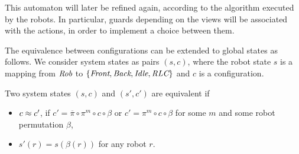 This automaton will later be refined 
again, according to the algorithm executed by the robots. In particular, 
guards depending on the views will be associated with the actions, 
in order to implement a choice between them.


The equivalence between configurations can be extended to global states as follows.
We consider system states as pairs $(s,c)$, where the robot state $s$ is a mapping from 
$\textit{Rob}$ to $\{\textit{Front}, \textit{Back}, \textit{Idle}, \textit{RLC} \}$ and $c$ is a configuration. 
\begin{definition}\label{def:state-equiv}
Two system states $(s,c)$ and $(s',c')$ are equivalent 
if
\begin{itemize}
\item $c \approx c'$,  if $c'= \overline \pi \circ \pi^{m} \circ  c \circ \beta$ or $c'= \pi^{m} \circ c \circ \beta$ 
 for some $m$ and some robot permutation $\beta$,
 \item  $s'(r)=s(\beta(r))$ for any robot $r$. 
 \end{itemize}
\end{definition}

